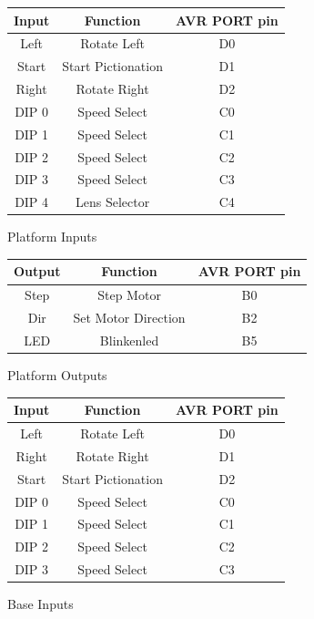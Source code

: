 \documentclass[dvips,12pt]{article}
\begin{document}
\renewcommand{\arraystretch}{1.4}%
\begin{figure}[htb]
\centering
\begin{tabular}{|c|c|c|}
\hline
Input&Function&AVR PORT pin\\
\hline
Left&Rotate Left&D0\\
\hline
Start&Start Pictionation&D1\\
\hline
Right&Rotate Right&D2\\
\hline
DIP 0&Speed Select&C0\\
\hline
DIP 1&Speed Select&C1\\
\hline
DIP 2&Speed Select&C2\\
\hline
DIP 3&Speed Select&C3\\
\hline
DIP 4&Lens Selector&C4\\
\hline
\end{tabular}
\caption{Platform Inputs}
\label{fig:platforminputs}
\end{figure}

\renewcommand{\arraystretch}{1.4}%
\begin{figure}[htb]
\centering
\begin{tabular}{|c|c|c|}
\hline
Output&Function&AVR PORT pin\\
\hline
Step&Step Motor&B0\\
\hline
Dir&Set Motor Direction&B2\\
\hline
LED&Blinkenled&B5\\
\hline
\end{tabular}
\caption{Platform Outputs}
\label{fig:platformoutputs}
\end{figure}

\renewcommand{\arraystretch}{1.4}%
\begin{figure}[htb]
\centering
\begin{tabular}{|c|c|c|}
\hline
Input&Function&AVR PORT pin\\
\hline
Left&Rotate Left&D0\\
\hline
Right&Rotate Right&D1\\
\hline
Start&Start Pictionation&D2\\
\hline
DIP 0&Speed Select&C0\\
\hline
DIP 1&Speed Select&C1\\
\hline
DIP 2&Speed Select&C2\\
\hline
DIP 3&Speed Select&C3\\
\hline
\end{tabular}
\caption{Base Inputs}
\label{fig:baseinputs}
\end{figure}
\end{document}
